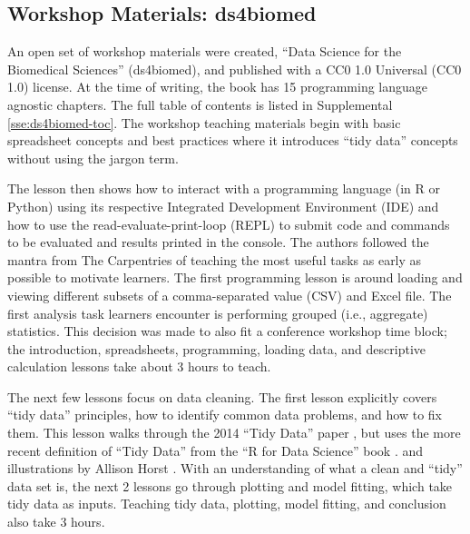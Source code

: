 \documentclass[030-workshop.tex]{subfiles}
\begin{document}
    \subsection{Workshop Materials: ds4biomed}

        An open set of workshop materials were created, ``Data Science for the Biomedical Sciences'' (ds4biomed),
        and published with a CC0 1.0 Universal (CC0 1.0) license. %
        At the time of writing, the book has 15 programming language agnostic chapters.
        The full table of contents is listed in
        Supplemental \ref{sse:ds4biomed-toc}.
        The workshop teaching materials begin with basic spreadsheet concepts and
        best practices where it introduces ``tidy data'' concepts
        without using the jargon term.

        The lesson then shows how to interact with a programming language (in R or Python) using
        its respective Integrated Development Environment (IDE) and
        how to use the read-evaluate-print-loop (REPL)
        to submit code and commands to be evaluated and results printed in the console.
        The authors followed the mantra from The Carpentries of teaching the most useful tasks as early as possible
        to motivate learners.
        The first programming lesson is around loading and viewing different subsets of a
        comma-separated value (CSV) and Excel file.
        The first analysis task learners encounter is performing grouped (i.e., aggregate) statistics.
        This decision was made to also fit a conference workshop time block;
        the introduction, spreadsheets, programming, loading data, and descriptive calculation lessons
        take about 3 hours to teach.

        The next few lessons focus on data cleaning.
        The first lesson explicitly covers ``tidy data'' principles,
        how to identify common data problems,
        and how to fix them.
        This lesson walks through the 2014 ``Tidy Data'' paper
        \cite{wickhamTidyData2014},
        but uses the more recent definition of ``Tidy Data'' from the ``R for Data Science'' book
        \cite{wickhamR4ds}.
        and illustrations by Allison Horst
        \cite{horstGitHubStatsIllustrations}. %
        With an understanding of what a clean and ``tidy'' data set is,
        the next 2 lessons go through plotting and model fitting,
        which take tidy data as inputs.
        Teaching tidy data, plotting, model fitting, and conclusion also take 3 hours.
\end{document}
